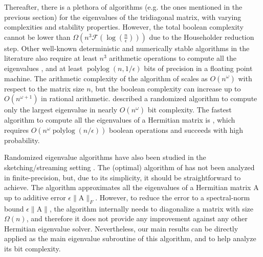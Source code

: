 \documentclass{article}
\DeclareMathOperator{\polylog}{polylog}
\newcommand\matA{\boldsymbol{\mathrm{A}}}
\newcommand{\flopcost}{\mathcal{F}}
\begin{document}
Thereafter, there is a plethora of algorithms (e.g. the ones mentioned in the previous section) for the eigenvalues of the tridiagonal matrix, with varying complexities and stability properties. However, the total boolean complexity cannot be lower than $\Omega(n^3\flopcost(\log(\frac{n}{\epsilon})))$ due to the Householder reduction step.
Other well-known deterministic and numerically stable algorithms in the literature also require at least $n^3$ arithmetic operations to compute all the eigenvalues \cite{paige1980accuracy,demmel1992jacobi,nakatsukasa2013stable}, and at least $\polylog(n,1/\epsilon)$ bits of precision in a floating point machine. The arithmetic complexity of the algorithm of \cite{pan1999complexity} scales as $O(n^\omega)$ with respect to the matrix size $n$, but the boolean complexity can increase up to $O(n^{\omega+1})$ in rational arithmetic. \cite{louis2016accelerated} described a randomized algorithm to compute only the largest eigenvalue in nearly $O(n^\omega)$ bit complexity. The fastest algorithm to compute all the eigenvalues of a Hermitian matrix is \cite{shah2025hermitian}, which requires $O(n^\omega\polylog(n/\epsilon))$ boolean operations and succeeds with high probability. 


Randomized eigenvalue algorithms have also been studied in the sketching/streaming setting \cite{andoni2013eigenvalues,needell2022testing,swartworth2023optimal}.
The (optimal) algorithm of \cite{swartworth2023optimal} has not been analyzed in finite-precision, but, due to its simplicity, it should be straightforward to achieve. 
The  algorithm approximates all the eigenvalues of a Hermitian matrix $\matA$ up to additive error $\epsilon\|\matA\|_F$. However, to reduce the error to a spectral-norm bound $\epsilon\|\matA\|$, the algorithm internally needs to diagonalize a matrix with size $\Omega(n)$, and therefore it does not provide any improvement against any other Hermitian eigenvalue solver.
Nevertheless, our main results can be directly applied as the main eigenvalue subroutine of this algorithm, and to help analyze its bit complexity.
\end{document}
